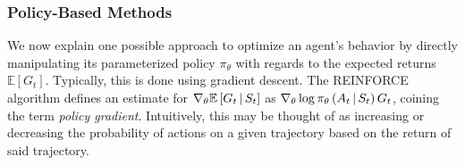 \subsubsection{Policy-Based Methods}
We now explain one possible approach to optimize an agent's behavior by directly manipulating its parameterized policy $\pi_\theta$ with regards to the expected returns $\mathbb{E}\left[G_t\right]$. Typically, this is done using gradient descent. The REINFORCE algorithm \cite{reinforce} defines an estimate for $\nabla_\theta \mathbb{E}\left[G_t \,\middle|\, S_t \right]$ as $\nabla_\theta \log \pi_\theta\left(A_t \,\middle|\, S_t\right) G_t$, coining the term \textit{policy gradient}. Intuitively, this may be thought of as increasing or decreasing the probability of actions on a given trajectory based on the return of said trajectory.